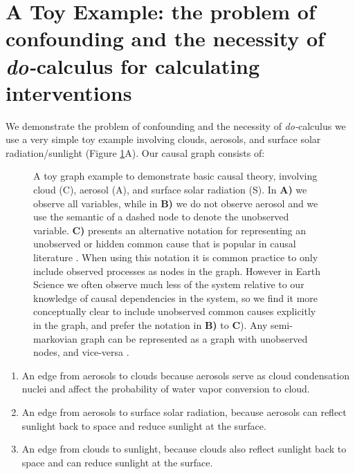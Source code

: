 \documentclass[12pt]{article}
\begin{document}
\section{A Toy Example: the problem of confounding and the necessity
  of \textit{do-}calculus for calculating interventions}
\label{sec:causal-graphs-pearls}

We demonstrate the problem of confounding and the necessity of
\textit{do-}calculus we use a very simple toy example involving
clouds, aerosols, and surface solar radiation/sunlight (Figure
\ref{fig:toy}A). Our causal graph consists of:

\begin{figure}
  \scalebox{1.0}{}
  \caption{A toy graph example to demonstrate basic causal theory,
    involving cloud (C), aerosol (A), and surface solar radiation
    (S). In \textbf{A)} we observe all variables, while in \textbf{B)}
    we do not observe aerosol and we use the semantic of a dashed node
    to denote the unobserved variable. \textbf{C)} presents an
    alternative notation for representing an unobserved or hidden
    common cause that is popular in causal literature \citep[e.g.,
    ``semi-markovian graphs'',][]{shpitser2006}. When using this
    notation it is common practice to only include observed processes
    as nodes in the graph. However in Earth Science we often observe
    much less of the system relative to our knowledge of causal
    dependencies in the system, so we find it more conceptually clear
    to include unobserved common causes explicitly in the graph, and
    prefer the notation in \textbf{B)} to \textbf{C}). Any
    semi-markovian graph can be represented as a graph with unobserved
    nodes, and vice-versa \citep[e.g.,][]{lee2019structural}.}
  \label{fig:toy}
\end{figure}

\begin{enumerate}
\item An edge from aerosols to clouds because aerosols serve as cloud
  condensation nuclei and affect the probability of water vapor
  conversion to cloud.
\item An edge from aerosols to surface solar radiation, because
  aerosols can reflect sunlight back to space and reduce sunlight
  at the surface.
\item An edge from clouds to sunlight, because clouds also reflect
  sunlight back to space and can reduce sunlight at the surface.
\end{enumerate}
\end{document}
